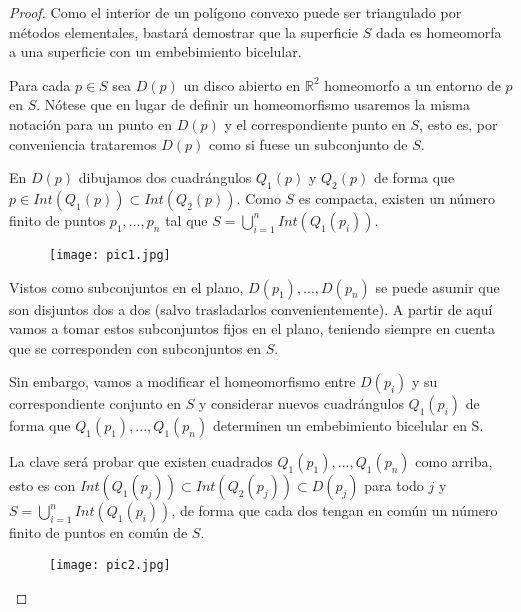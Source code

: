 \begin{proof}

	Como el interior de un polígono convexo puede ser triangulado por métodos elementales, bastará demostrar que la superficie $S$ dada es homeomorfa a una superficie con un embebimiento bicelular.

	Para cada $p \in S$ sea $D(p)$ un disco abierto en $\mathbb{R}^2$ homeomorfo a un entorno de $p$ en $S$. Nótese que en lugar de definir un homeomorfismo usaremos la misma notación para un punto en $D(p)$ y el correspondiente punto en $S$, esto es,  por conveniencia trataremos $D(p)$ como si fuese un subconjunto de $S$.

	En $D(p)$ dibujamos dos cuadrángulos $Q_{1}(p)$ y $Q_{2}(p)$ de forma que $p \in Int(Q_{1}(p)) \subset Int(Q_{2}(p))$. Como $S$ es  compacta, existen un número finito de puntos $p_{1},...,p_{n}$ tal que $S = \bigcup_{i = 1}^{n} Int(Q_{1}(p_{i}))$.

\begin{figure}[h]
\centering
\begin{minipage}[c]{\textwidth}
\centering
    \texttt{[image: pic1.jpg]}
\end{minipage}
\end{figure}

	Vistos como subconjuntos en el plano, $D(p_{1}),...,D(p_{n})$ se puede asumir que son disjuntos dos a dos (salvo trasladarlos convenientemente). A partir de aquí vamos a tomar estos subconjuntos fijos en el plano, teniendo siempre en cuenta que se corresponden con subconjuntos en $S$.

	Sin embargo, vamos a modificar el homeomorfismo entre $D(p_i)$ y su correspondiente conjunto en $S$ y considerar nuevos cuadrángulos $Q_{1}(p_i)$ de forma que $Q_{1}(p_{1}),...,Q_{1}(p_{n})$  determinen un embebimiento bicelular en S.

La clave será probar que existen cuadrados  $Q_{1}(p_{1}),...,Q_{1}(p_{n})$  como arriba, esto es con $Int(Q_{1}(p_j)) \subset Int(Q_{2}(p_j))\subset D(p_j)$ para todo $j$ y $S = \bigcup_{i = 1}^{n} Int(Q_{1}(p_{i}))$, de forma que  cada dos   tengan en común un número finito de puntos en común de $S$. 

\begin{figure}[h]
\centering
\begin{minipage}[c]{\textwidth}
\centering
    \texttt{[image: pic2.jpg]}
\end{minipage}
\end{figure}


\end{proof}
